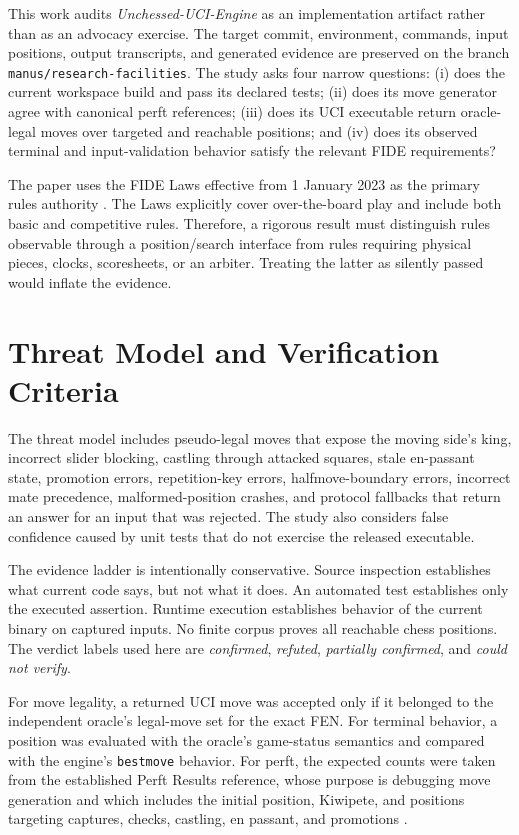 \documentclass[conference]{IEEEtran}
\begin{document}
This work audits \textit{Unchessed-UCI-Engine} as an implementation artifact rather than as an advocacy exercise. The target commit, environment, commands, input positions, output transcripts, and generated evidence are preserved on the branch \texttt{manus/research-facilities}. The study asks four narrow questions: (i) does the current workspace build and pass its declared tests; (ii) does its move generator agree with canonical perft references; (iii) does its UCI executable return oracle-legal moves over targeted and reachable positions; and (iv) does its observed terminal and input-validation behavior satisfy the relevant FIDE requirements?

The paper uses the FIDE Laws effective from 1 January 2023 as the primary rules authority \cite{fide}. The Laws explicitly cover over-the-board play and include both basic and competitive rules. Therefore, a rigorous result must distinguish rules observable through a position/search interface from rules requiring physical pieces, clocks, scoresheets, or an arbiter. Treating the latter as silently passed would inflate the evidence.

\section{Threat Model and Verification Criteria}
The threat model includes pseudo-legal moves that expose the moving side's king, incorrect slider blocking, castling through attacked squares, stale en-passant state, promotion errors, repetition-key errors, halfmove-boundary errors, incorrect mate precedence, malformed-position crashes, and protocol fallbacks that return an answer for an input that was rejected. The study also considers false confidence caused by unit tests that do not exercise the released executable.

The evidence ladder is intentionally conservative. Source inspection establishes what current code says, but not what it does. An automated test establishes only the executed assertion. Runtime execution establishes behavior of the current binary on captured inputs. No finite corpus proves all reachable chess positions. The verdict labels used here are \emph{confirmed}, \emph{refuted}, \emph{partially confirmed}, and \emph{could not verify}.

For move legality, a returned UCI move was accepted only if it belonged to the independent oracle's legal-move set for the exact FEN. For terminal behavior, a position was evaluated with the oracle's game-status semantics and compared with the engine's \texttt{bestmove} behavior. For perft, the expected counts were taken from the established Perft Results reference, whose purpose is debugging move generation and which includes the initial position, Kiwipete, and positions targeting captures, checks, castling, en passant, and promotions \cite{perft}.
\end{document}
